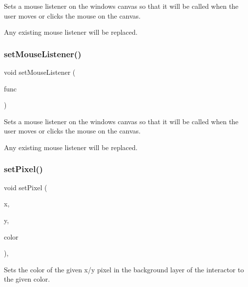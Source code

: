 Sets a mouse listener on the window\textquotesingle{}s canvas so that it will be called when the user moves or clicks the mouse on the canvas. 

Any existing mouse listener will be replaced. \mbox{\label{classGWindow_aea7f647ea62d59f71b5fad6aa65eeaf9}} 
\subsubsection{\texorpdfstring{set\+Mouse\+Listener()}{setMouseListener()}\hspace{0.1cm}{\footnotesize\ttfamily [2/2]}}
{\footnotesize\ttfamily void set\+Mouse\+Listener (\begin{DoxyParamCaption}\item[{G\+Event\+Listener\+Void}]{func }\end{DoxyParamCaption})\hspace{0.3cm}{\ttfamily [virtual]}}



Sets a mouse listener on the window\textquotesingle{}s canvas so that it will be called when the user moves or clicks the mouse on the canvas. 

Any existing mouse listener will be replaced. \mbox{\label{classGDrawingSurface_a09f9640e4ff7388dcfc391efd88d2415}} 
\subsubsection{\texorpdfstring{set\+Pixel()}{setPixel()}\hspace{0.1cm}{\footnotesize\ttfamily [1/3]}}
{\footnotesize\ttfamily void set\+Pixel (\begin{DoxyParamCaption}\item[{double}]{x,  }\item[{double}]{y,  }\item[{const std\+::string \&}]{color }\end{DoxyParamCaption})\hspace{0.3cm}{\ttfamily [virtual]}, {\ttfamily [inherited]}}



Sets the color of the given x/y pixel in the background layer of the interactor to the given color. 

